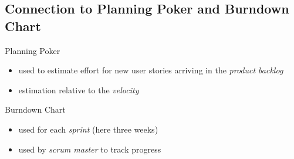 \subsection{Connection to Planning Poker and Burndown Chart}
\begin{frame}{\insertsubsection}
	\begin{fancycolumns}[widths={35}]
		\begin{note}{Planning Poker}
			\begin{itemize}
				\item used to estimate effort for new user stories arriving in the \emph{product backlog}
				\item estimation relative to the \emph{velocity}
			\end{itemize}
		\end{note}
	\nextcolumn
		\begin{note}{Burndown Chart}
			\begin{itemize}
				\item used for each \emph{sprint} (here three weeks)
				\item used by \emph{scrum master} to track progress
			\end{itemize}
		\end{note}
	\end{fancycolumns}
\end{frame}


